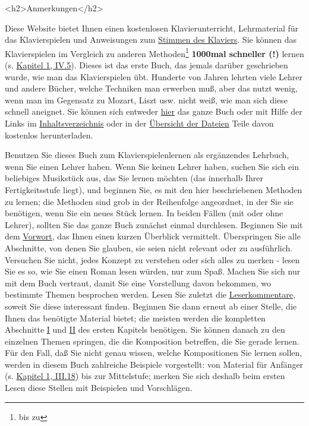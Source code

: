 
\hypertarget{anmerkungen}{}

<h2>Anmerkungen</h2>

Diese Website bietet Ihnen einen kostenlosen Klavierunterricht, Lehrmaterial für das Klavierspielen und Anweisungen zum \hyperlink{c2_1}{Stimmen des Klaviers}.
Sie können das Klavierspielen im Vergleich zu anderen Methoden\footnote{bis zu} \textbf{1000mal schneller (!)} lernen (s. \hyperlink{c1iv5}{Kapitel 1, IV.5}).
Dieses ist das erste Buch, das jemals darüber geschrieben wurde, wie man das Klavierspielen übt.
Hunderte von Jahren lehrten viele Lehrer und andere Bücher, welche Techniken man erwerben muß, aber das nutzt wenig, wenn man im Gegensatz zu Mozart, Liszt usw. nicht weiß, wie man sich diese schnell aneignet.
Sie können sich entweder \hyperlink{copy}{hier} das ganze Buch oder mit Hilfe der Links im \hyperlink{Inhalt}{Inhaltsverzeichnis} oder in der \hyperref[./dateien.html\#copy]{Übersicht der Dateien} Teile davon kostenlos herunterladen.

Benutzen Sie dieses Buch zum Klavierspielenlernen als ergänzendes Lehrbuch, wenn Sie einen Lehrer haben.
Wenn Sie keinen Lehrer haben, suchen Sie sich ein beliebiges Musikstück aus, das Sie lernen möchten (das innerhalb Ihrer Fertigkeitsstufe liegt), und beginnen Sie, es mit den hier beschriebenen Methoden zu lernen; die Methoden sind grob in der Reihenfolge angeordnet, in der Sie sie benötigen, wenn Sie ein neues Stück lernen.
In beiden Fällen (mit oder ohne Lehrer), sollten Sie das ganze Buch zunächst einmal durchlesen.
Beginnen Sie mit dem \hyperlink{preface}{Vorwort}, das Ihnen einen kurzen Überblick vermittelt.
Überspringen Sie alle Abschnitte, von denen Sie glauben, sie seien nicht relevant oder zu ausführlich.
Versuchen Sie nicht, jedes Konzept zu verstehen oder sich alles zu merken - lesen Sie es so, wie Sie einen Roman lesen würden, nur zum Spaß.
Machen Sie sich nur mit dem Buch vertraut, damit Sie eine Vorstellung davon bekommen, wo bestimmte Themen besprochen werden.
Lesen Sie zuletzt die \hyperlink{testimonials}{Leserkommentare}, soweit Sie diese interessant finden.
Beginnen Sie dann erneut ab einer Stelle, die Ihnen das benötigte Material bietet; die meisten werden die kompletten Abschnitte \hyperlink{c1i1}{I} und \hyperlink{c1ii1}{II} des ersten Kapitels benötigen.
Sie können danach zu den einzelnen Themen springen, die die Komposition betreffen, die Sie gerade lernen.
Für den Fall, daß Sie nicht genau wissen, welche Kompositionen Sie lernen sollen, werden in diesem Buch zahlreiche Beispiele vorgestellt: von Material für Anfänger (s. \hyperlink{c1iii18}{Kapitel 1, III.18}) bis zur Mittelstufe; merken Sie sich deshalb beim ersten Lesen diese Stellen mit Beispielen und Vorschlägen.

